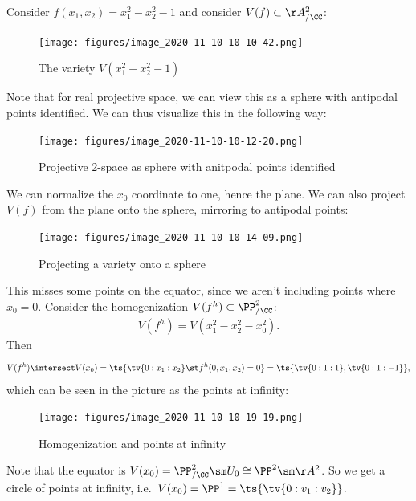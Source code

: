 \begin{example}[?]

Consider \(f(x_1, x_2) = x_1^2 - x_2^2 - 1\) and consider
\(V(f) \subset \AA^2_{/\CC}\):

\begin{figure}
\centering
\texttt{[image: figures/image\_2020-11-10-10-10-42.png]}
\caption{The variety \(V(x_1^2 - x_2^2 - 1)\)}
\end{figure}

Note that for real projective space, we can view this as a sphere with
antipodal points identified. We can thus visualize this in the following
way:

\begin{figure}
\centering
\texttt{[image: figures/image\_2020-11-10-10-12-20.png]}
\caption{Projective 2-space as sphere with anitpodal points identified}
\end{figure}

We can normalize the \(x_0\) coordinate to one, hence the plane. We can
also project \(V(f)\) from the plane onto the sphere, mirroring to
antipodal points:

\begin{figure}
\centering
\texttt{[image: figures/image\_2020-11-10-10-14-09.png]}
\caption{Projecting a variety onto a sphere}
\end{figure}

This misses some points on the equator, since we aren't including points
where \(x_0 = 0\). Consider the homogenization
\(V(f^h) \subset \PP^2_{/\CC}\):
\begin{align*}  
V(f^h) = V(x_1^2 - x_2^2 - x_0^2)
.\end{align*} Then
\begin{align*}  
V(f^h) \intersect V(x_0) = \ts{\tv{0:x_1:x_2} \st f^h(0, x_1, x_2) = 0 } = \ts{\tv{0:1:1}, \tv{0:1:-1}}
,\end{align*} which can be seen in the picture as the points at
infinity:

\begin{figure}
\centering
\texttt{[image: figures/image\_2020-11-10-10-19-19.png]}
\caption{Homogenization and points at infinity}
\end{figure}

Note that the equator is
\(V(x_0) = \PP^2_{/\CC}\sm U_0 \cong \PP^2\sm \AA^2\). So we get a
circle of points at infinity,
i.e.~\(V(x_0) = \PP^1 = \ts{\tv{0:v_1:v_2}}\).

\end{example}

